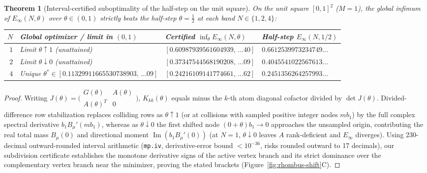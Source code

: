 \documentclass[11pt,reqno]{amsart}
\newtheorem{theorem}{Theorem}[section]
\theoremstyle{definition}
\theoremstyle{remark}
\begin{document}
\begin{theorem}[Interval-certified suboptimality of the half-step on the unit square]\label{thm:square-shift}
On the unit square $[0,1]^2$ ($M = 1$), the global infimum of $E_\infty(N, \theta)$ over $\theta \in (0, 1)$ strictly beats the half-step $\theta = \frac12$ at each band $N \in \{1, 2, 4\}$:
\begin{center}
\footnotesize
\begin{tabular}{rlll}
\toprule
$N$ & Global optimizer / limit in $(0,1)$ & Certified $\inf_\theta E_\infty(N,\theta)$ & Half-step $E_\infty(N, 1/2)$ \\
\midrule
$1$ & Limit $\theta \uparrow 1$ (unattained) & $[0.60987939561604939,\, \dots 40]$ & $0.6612539973234749\dots$ \\
$2$ & Limit $\theta \downarrow 0$ (unattained) & $[0.37347544568190208,\, \dots 09]$ & $0.4045541022567613\dots$ \\
$4$ & Unique $\theta^* \in [0.11329911665530738903,\, \dots 09]$ & $[0.24216109141774661,\, \dots 62]$ & $0.2451356264257993\dots$ \\
\bottomrule
\end{tabular}
\end{center}
\end{theorem}

\begin{proof}
Writing $J(\theta) = \bigl(\begin{smallmatrix} G(\theta) & A(\theta) \\ A(\theta)^T & 0 \end{smallmatrix}\bigr)$, $K_{kk}(\theta)$ equals minus the $k$-th atom diagonal cofactor divided by $\det J(\theta)$. Divided-difference row stabilization replaces colliding rows as $\theta \uparrow 1$ (or at collisions with sampled positive integer nodes $m b_1$) by the full complex spectral derivative $b_1 B_\mu'(m b_1)$, whereas as $\theta \downarrow 0$ the first shifted node $(0+\theta)b_1 \to 0$ approaches the unsampled origin, contributing the real total mass $B_\mu(0)$ and directional moment $\operatorname{Im}(b_1 B_\mu'(0))$ (at $N=1$, $\theta\downarrow 0$ leaves $A$ rank-deficient and $E_\infty$ diverges). Using 230-decimal outward-rounded interval arithmetic (\texttt{mp.iv}, derivative-error bound $< 10^{-36}$, risks rounded outward to 17 decimals), our subdivision certificate establishes the monotone derivative signs of the active vertex branch and its strict dominance over the complementary vertex branch near the minimizer, proving the stated brackets (Figure~\ref{fig:rhombus-shift}C).
\end{proof}
\end{document}
